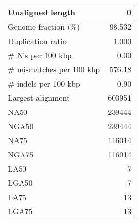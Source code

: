 \documentclass[12pt,a4paper]{article}
\begin{document}
\begin{table}[ht]
\begin{center}
\begin{tabular}{|l*{1}{|r}|}
Unaligned length & 0 \\ \hline
Genome fraction (\%) & 98.532 \\ \hline
Duplication ratio & 1.000 \\ \hline
\# N's per 100 kbp & 0.00 \\ \hline
\# mismatches per 100 kbp & 576.18 \\ \hline
\# indels per 100 kbp & 0.90 \\ \hline
Largest alignment & 600951 \\ \hline
NA50 & 239444 \\ \hline
NGA50 & 239444 \\ \hline
NA75 & 116014 \\ \hline
NGA75 & 116014 \\ \hline
LA50 & 7 \\ \hline
LGA50 & 7 \\ \hline
LA75 & 13 \\ \hline
LGA75 & 13 \\ \hline
\end{tabular}
\end{center}
\end{table}
\end{document}
